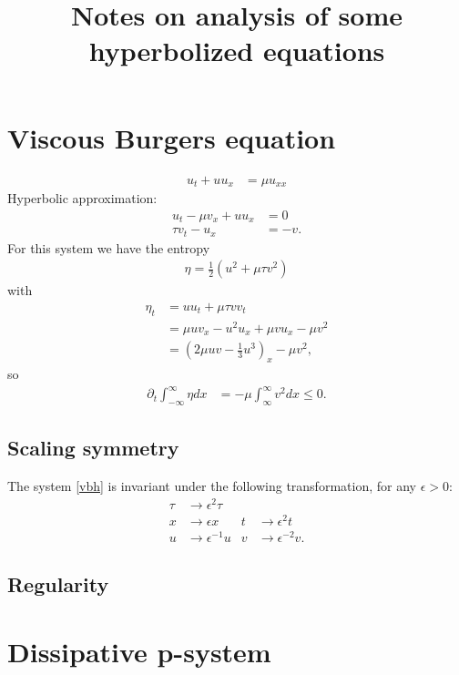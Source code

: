 \documentclass{article}
\title{Notes on analysis of some hyperbolized equations}
\theoremstyle{plain}
\theoremstyle{definition}
\numberwithin{theorem}{section}
\begin{document}
\maketitle

\section{Viscous Burgers equation}
\begin{align}
    u_t + u u_x & = \mu u_{xx}
\end{align}
Hyperbolic approximation:
\begin{align} \label{vbh}
    u_t - \mu v_x + u u_x & = 0 \\
    \tau v_t - u_x & = -v.
\end{align}
For this system we have the entropy
\begin{align}
    \eta = \frac{1}{2} \left(u^2 + \mu \tau v^2\right)
\end{align}
with
\begin{align}
    \eta_t & = u u_t + \mu \tau v v_t \\
    & = \mu u v_x - u^2 u_x + \mu v u_x -\mu v^2 \\
    & = \left( 2 \mu uv - \frac{1}{3}u^3\right)_x - \mu v^2,
\end{align}
so
\begin{align}
\partial_t \int_{-\infty}^\infty \eta dx & = -\mu \int_\infty^\infty v^2 dx \le 0.
\end{align}


\subsection{Scaling symmetry}
The system \eqref{vbh} is invariant under the following transformation, for any $\epsilon>0$:
\begin{subequations}
\label{vbh-scaling}
\begin{align}
    \tau & \to \epsilon^2 \tau \\
    x & \to \epsilon x & t & \to \epsilon^2 t \\
    u & \to \epsilon^{-1} u & v & \to \epsilon^{-2} v.
\end{align}
\end{subequations}
\subsection{Regularity}

\section{Dissipative p-system}
\end{document}

